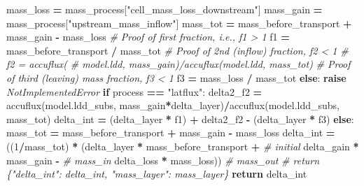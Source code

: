 \documentclass[]{article}
\newenvironment{Shaded}{\begin{snugshade}}{\end{snugshade}}
\newcommand{\DecValTok}[1]{\textcolor[rgb]{0.00,0.00,0.81}{#1}}
\newcommand{\StringTok}[1]{\textcolor[rgb]{0.31,0.60,0.02}{#1}}
\newcommand{\CommentTok}[1]{\textcolor[rgb]{0.56,0.35,0.01}{\textit{#1}}}
\newcommand{\ControlFlowTok}[1]{\textcolor[rgb]{0.13,0.29,0.53}{\textbf{#1}}}
\newcommand{\OperatorTok}[1]{\textcolor[rgb]{0.81,0.36,0.00}{\textbf{#1}}}
\newcommand{\PreprocessorTok}[1]{\textcolor[rgb]{0.56,0.35,0.01}{\textit{#1}}}
\newcommand{\NormalTok}[1]{#1}
\begin{document}
\begin{Shaded}
\begin{Highlighting}[]
\NormalTok{        mass_loss }\OperatorTok{=}\NormalTok{ mass_process[}\StringTok{"cell_mass_loss_downstream"}\NormalTok{]}
\NormalTok{        mass_gain }\OperatorTok{=}\NormalTok{ mass_process[}\StringTok{"upstream_mass_inflow"}\NormalTok{]}
\NormalTok{        mass_tot }\OperatorTok{=}\NormalTok{ mass_before_transport }\OperatorTok{+}\NormalTok{ mass_gain }\OperatorTok{-}\NormalTok{ mass_loss}
        \CommentTok{# Proof of first fraction, i.e., f1 > 1}
\NormalTok{        f1 }\OperatorTok{=}\NormalTok{ mass_before_transport }\OperatorTok{/}\NormalTok{ mass_tot  }
        \CommentTok{# Proof of 2nd (inflow) fraction, f2 < 1}
        \CommentTok{# f2 = accuflux(}
        \CommentTok{#   model.ldd, mass_gain)/accuflux(model.ldd, mass_tot)  }
        \CommentTok{# Proof of third (leaving) mass fraction, f3 < 1}
\NormalTok{        f3 }\OperatorTok{=}\NormalTok{ mass_loss }\OperatorTok{/}\NormalTok{ mass_tot  }
    \ControlFlowTok{else}\NormalTok{:}
        \ControlFlowTok{raise} \PreprocessorTok{NotImplementedError}
    \ControlFlowTok{if}\NormalTok{ process }\OperatorTok{==} \StringTok{"latflux"}\NormalTok{:}
\NormalTok{        delta2_f2 }\OperatorTok{=}\NormalTok{ accuflux(model.ldd_subs, mass_gain}\OperatorTok{*}\NormalTok{delta_layer)}\OperatorTok{/}\NormalTok{accuflux(model.ldd_subs, mass_tot)}
\NormalTok{        delta_int }\OperatorTok{=}\NormalTok{ (delta_layer }\OperatorTok{*}\NormalTok{ f1) }\OperatorTok{+}\NormalTok{ delta2_f2 }\OperatorTok{-}\NormalTok{ (delta_layer }\OperatorTok{*}\NormalTok{ f3)}
    \ControlFlowTok{else}\NormalTok{:}
\NormalTok{        mass_tot }\OperatorTok{=}\NormalTok{ mass_before_transport }\OperatorTok{+}\NormalTok{ mass_gain }\OperatorTok{-}\NormalTok{ mass_loss}
\NormalTok{        delta_int }\OperatorTok{=}\NormalTok{ ((}\DecValTok{1}\OperatorTok{/}\NormalTok{mass_tot) }\OperatorTok{*}
\NormalTok{                     (delta_layer }\OperatorTok{*}\NormalTok{ mass_before_transport }\OperatorTok{+}  \CommentTok{# initial}
\NormalTok{                      delta_gain }\OperatorTok{*}\NormalTok{ mass_gain }\OperatorTok{-}  \CommentTok{# mass_in}
\NormalTok{                      delta_loss }\OperatorTok{*}\NormalTok{ mass_loss))  }\CommentTok{# mass_out}
    \CommentTok{# return \{"delta_int": delta_int, "mass_layer": mass_layer\}}
    \ControlFlowTok{return}\NormalTok{ delta_int}
                       
\end{Highlighting}
\end{Shaded}


\end{document}
